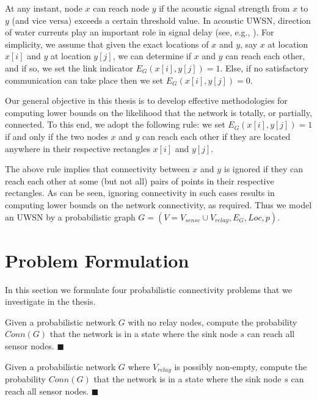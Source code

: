 At any instant, node $x$ can reach node $y$ if the acoustic signal strength
from $x$ to $y$ (and vice versa) exceeds a certain threshold value.
%
In acoustic UWSN, direction of water currents play an important role
in signal delay (see, e.g., \cite{pu2013comparing}).
%
For simplicity, we assume that given the exact locations of $x$ and $y$, say $x$ at location $x[i]$ and $y$ at location $y[j]$, we can determine if $x$ and $y$ can reach each other, and if so, we
set the link indicator $E_G (x[i],y[j])= 1$.
%
Else, if no satisfactory communication can take place then
we set $E_G (x[i],y[j])= 0$.


Our general objective in this thesis is to develop effective methodologies
for computing lower bounds on the likelihood that the network is totally,
or partially, connected.
%
To this end, we adopt the following rule: we set $E_G(x[i],y[j])= 1$
if and only if the two nodes $x$ and $y$ can reach each other if
they are located anywhere in their respective rectangles $x[i]$ and $y[j]$.


The above rule implies that connectivity between $x$ and $y$ is ignored if 
they can reach each other at some (but not all) pairs of points in their
respective rectangles.
%
As can be seen, ignoring connectivity in such cases results
in computing lower bounds on the network connectivity, as required.
%
Thus we model an UWSN by a probabilistic graph $G=(V=V_{sense}\cup V_{relay},E_G,Loc,p)$.

\section{Problem Formulation}
\label{ch1:pf}
In this section we formulate four probabilistic connectivity problems that we investigate in the thesis. 


\begin{definition}
\normalfont
Given a probabilistic network $G$ with no relay nodes, compute the probability $Conn(G)$ that the network is in a state where the sink node $s$ can reach all sensor nodes. $\blacksquare$
\end{definition}


\begin{definition}
\normalfont
Given a probabilistic network $G$ where $V_{relay}$ is possibly non-empty, compute the probability $Conn(G)$ that the network is in a state where the sink node $s$ can reach all sensor nodes. $\blacksquare$
\end{definition}


